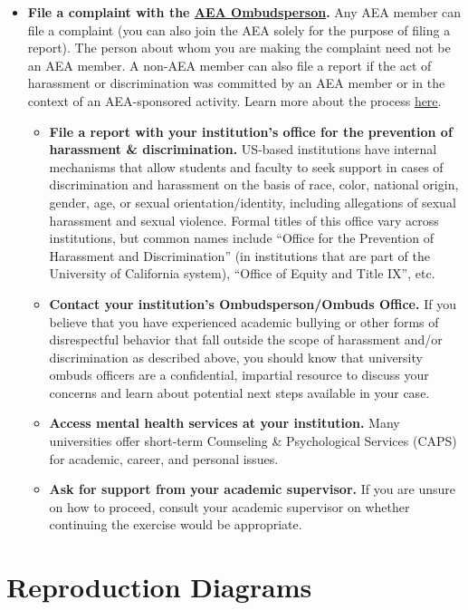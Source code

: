 \documentclass[]{book}
\providecommand{\tightlist}{%
  \setlength{\itemsep}{0pt}\setlength{\parskip}{0pt}}
\begin{document}
\begin{itemize}
\tightlist
\item
  \textbf{File a complaint with the \href{https://www.aeaweb.org/about-aea/aea-ombudsperson}{AEA Ombudsperson}.} Any AEA member can file a complaint (you can also join the AEA solely for the purpose of filing a report). The person about whom you are making the complaint need not be an AEA member. A non-AEA member can also file a report if the act of harassment or discrimination was committed by an AEA member or in the context of an AEA-sponsored activity. Learn more about the process \href{https://www.aeaweb.org/about-aea/aea-ombudsperson/faq}{here}.

  \begin{itemize}
  \tightlist
  \item
    \textbf{File a report with your institution's office for the prevention of harassment \& discrimination.} US-based institutions have internal mechanisms that allow students and faculty to seek support in cases of discrimination and harassment on the basis of race, color, national origin, gender, age, or sexual orientation/identity, including allegations of sexual harassment and sexual violence. Formal titles of this office vary across institutions, but common names include ``Office for the Prevention of Harassment and Discrimination'' (in institutions that are part of the University of California system), ``Office of Equity and Title IX'', etc.
  \item
    \textbf{Contact your institution's Ombudsperson/Ombuds Office.} If you believe that you have experienced academic bullying or other forms of disrespectful behavior that fall outside the scope of harassment and/or discrimination as described above, you should know that university ombuds officers are a confidential, impartial resource to discuss your concerns and learn about potential next steps available in your case.
  \item
    \textbf{Access mental health services at your institution.} Many universities offer short-term Counseling \& Psychological Services (CAPS) for academic, career, and personal issues.
  \item
    \textbf{Ask for support from your academic supervisor.} If you are unsure on how to proceed, consult your academic supervisor on whether continuing the exercise would be appropriate.
  \end{itemize}
\end{itemize}

\hypertarget{reproduction-diagrams}{%
\chapter{Reproduction Diagrams}\label{reproduction-diagrams}}
\end{document}
